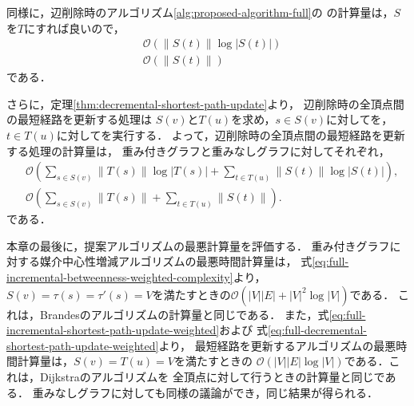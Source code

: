 同様に，辺削除時のアルゴリズム\ref{alg:proposed-algorithm-full}の
の計算量は，$S$を$T$にすれば良いので，
\begin{equation*}
  \begin{aligned}
    &\mathcal{O}\left(\|S(t)\|\log|S(t)|\right) \\
    &\mathcal{O}\left(\|S(t)\|\right)
  \end{aligned}
\end{equation*}
である．

さらに，定理\ref{thm:decremental-shortest-path-update}より，
辺削除時の全頂点間の最短経路を更新する処理は
$S(v)$と$T(u)$を求め，$s\in S(v)$に対してを，
$t\in T(u)$に対してを実行する．
よって，辺削除時の全頂点間の最短経路を更新する処理の計算量は，
重み付きグラフと重みなしグラフに対してそれぞれ，
\begin{align}
  &\mathcal{O}\left(\sum_{s\in S(v)}\|T(s)\|\log|T(s)|+\sum_{t\in T(u)}\|S(t)\|\log|S(t)|\right),
  \label{eq:full-decremental-shortest-path-update-weighted} \\
  &\mathcal{O}\left(\sum_{s\in S(v)}\|T(s)\|+\sum_{t\in T(u)}\|S(t)\|\right).
  \label{eq:full-decremental-shortest-path-update-unweighted}
  \end{align}
である．

本章の最後に，提案アルゴリズムの最悪計算量を評価する．
重み付きグラフに対する媒介中心性増減アルゴリズムの最悪時間計算量は，
式\eqref{eq:full-incremental-betweenness-weighted-complexity}より，
$S(v)=\tau(s)=\tau'(s)=V$を満たすときの$\mathcal{O}(|V||E|+|V|^2\log|V|)$である．
これは，Brandesのアルゴリズムの計算量と同じである．
また，式\eqref{eq:full-incremental-shortest-path-update-weighted}および
式\eqref{eq:full-decremental-shortest-path-update-weighted}より，
最短経路を更新するアルゴリズムの最悪時間計算量は，$S(v)=T(u)=V$を満たすときの
$\mathcal{O}(|V||E|\log|V|)$である．これは，Dijkstraのアルゴリズムを
全頂点に対して行うときの計算量と同じである．
重みなしグラフに対しても同様の議論ができ，同じ結果が得られる．
